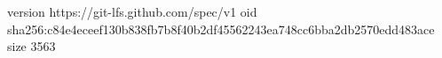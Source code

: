version https://git-lfs.github.com/spec/v1
oid sha256:c84e4eceef130b838fb7b8f40b2df45562243ea748cc6bba2db2570edd483ace
size 3563

